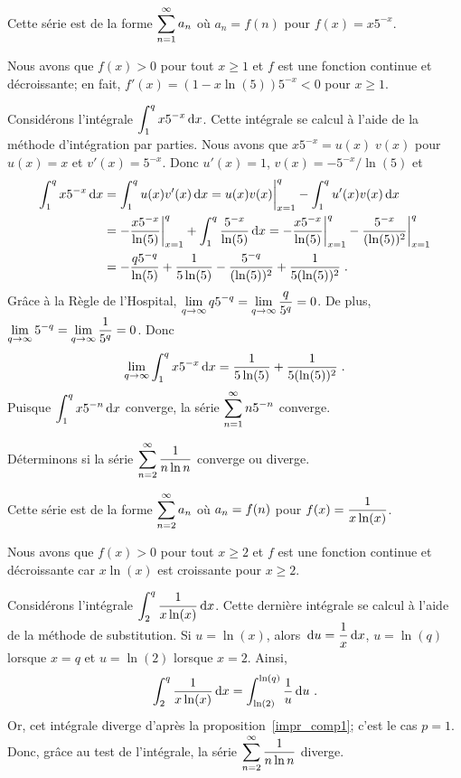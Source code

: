 {\begin{egg}
Cette série est de la forme $\displaystyle \sum_{n=1}^\infty a_n$ où
$a_n = f(n)$ pour $f(x) = x 5^{-x}$.

Nous avons que $f(x) > 0$ pour tout $x\geq 1$ et $f$ est une fonction
continue et décroissante; en fait,
$f'(x) = (1 - x\ln(5))5^{-x} < 0$ pour $x\geq 1$.

Considérons l'intégrale $\displaystyle \int_1^q x 5^{-x}\,\mathrm{d}x$.
Cette intégrale se calcul à l'aide de la méthode
d'intégration par parties.  Nous avons que
$x 5^{-x} = u(x) \; v(x)$ pour $u(x) = x$ et $v'(x) = 5^{-x}$.  Donc
$u'(x)=1$, $v(x) = -5^{-x}/\ln(5)$ et
\begin{align*}
\int_1^q x 5^{-x} \,\mathrm{d}x
&= \int_1^q u(x)v'(x)\,\mathrm{d}x
= u(x)v(x)\bigg|_{x=1}^q - \int_1^q u'(x) v(x)\,\mathrm{d}x \\
&= -\frac{x 5^{-x}}{\ln(5)}\bigg|_{x=1}^q
+ \int_1^q \frac{5^{-x}}{\ln(5)}\,\mathrm{d}x
= -\frac{x 5^{-x}}{\ln(5)}\bigg|_{x=1}^q
- \frac{5^{-x}}{(\ln(5))^2}\bigg|_{x=1}^q \\
&= -\frac{q 5^{-q}}{\ln(5)} + \frac{1}{5\ln(5)}
- \frac{5^{-q}}{(\ln(5))^2} + \frac{1}{5(\ln(5))^2} \; .
\end{align*}
Grâce à la Règle de l'Hospital,
$\displaystyle \lim_{q\rightarrow \infty}q 5^{-q} = 
\lim_{q\rightarrow \infty} \frac{q}{5^q} = 0$.  De plus,
$\displaystyle \lim_{q\rightarrow \infty} 5^{-q} =
\lim_{q\rightarrow \infty} \frac{1}{5^q} = 0$.  Donc
\[
\lim_{q\rightarrow \infty} \int_1^q x 5^{-x} \,\mathrm{d}x
= \frac{1}{5\ln(5)} + \frac{1}{5(\ln(5))^2} \; .
\]
Puisque $\displaystyle \int_1^q x 5^{-n}\,\mathrm{d}x$ converge, la série
$\displaystyle \sum_{n=1}^\infty n 5^{-n}$ converge.
\end{egg}

\begin{egg}
Déterminons si la série
$\displaystyle \sum_{n=2}^\infty \frac{1}{n\ln{n}}$ converge ou diverge.

Cette série est de la forme $\displaystyle \sum_{n=2}^\infty a_n$ où
$\displaystyle a_n = f(n)$ pour
$\displaystyle f(x) = \frac{1}{x\ln(x)}$.

Nous avons que $f(x) > 0$ pour tout $x\geq 2$ et $f$ est une fonction
continue et décroissante car $x\ln(x)$ est croissante pour $x\geq 2$.

Considérons l'intégrale $\displaystyle \int_2^q \frac{1}{x\ln(x)} \,\mathrm{d}x$.
Cette dernière intégrale se calcul à l'aide de la méthode de
substitution.  Si $u = \ln(x)$, alors
$\displaystyle \,\mathrm{d}u = \frac{1}{x} \,\mathrm{d}x$, $u = \ln(q)$ lorsque
$x=q$ et $u = \ln(2)$ lorsque $x=2$.  Ainsi,
\[
\int_2^q \frac{1}{x\ln(x)} \,\mathrm{d}x
= \int_{\ln(2)}^{\ln(q)} \frac{1}{u} \,\mathrm{d}u \ .
\]
Or, cet intégrale diverge d'après la proposition~\ref{impr_comp1};
c'est le cas $p=1$.  Donc, grâce au test de l'intégrale, la série
$\displaystyle \sum_{n=2}^\infty \frac{1}{n\ln{n}}$ diverge.
\end{egg}

}  %


